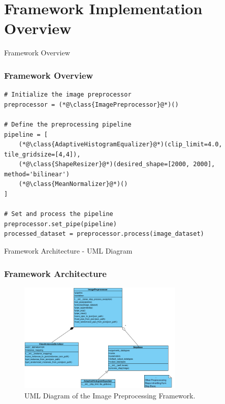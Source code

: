 \section{Framework Implementation Overview}
\label{framework_implementation_overview_section}


\begin{frame}[fragile]{Framework Overview}
    \frametitle{Framework Overview}

    \begin{lstlisting}[caption={Example Usage of the Image Preprocessing Framework.}, label=lst:frameworkusage, basicstyle=\scriptsize\ttfamily]
# Initialize the image preprocessor
preprocessor = (*@\class{ImagePreprocessor}@*)()

# Define the preprocessing pipeline
pipeline = [
    (*@\class{AdaptiveHistogramEqualizer}@*)(clip_limit=4.0, tile_gridsize=[4,4]),
    (*@\class{ShapeResizer}@*)(desired_shape=[2000, 2000], method='bilinear')
    (*@\class{MeanNormalizer}@*)()
]

# Set and process the pipeline
preprocessor.set_pipe(pipeline)
processed_dataset = preprocessor.process(image_dataset)
    \end{lstlisting}
\end{frame}

\begin{frame}{Framework Architecture - UML Diagram}
    \frametitle{Framework Architecture}
    \begin{figure}
        \center
        \includegraphics[width=0.7\textwidth]{figures/image_preprocessing_uml.png}
        \caption{UML Diagram of the Image Preprocessing Framework.}
        \label{fig:uml_diagram}
    \end{figure}
\end{frame}

